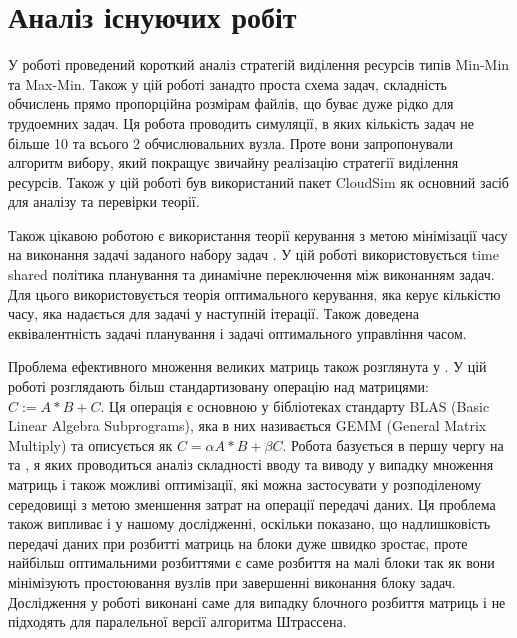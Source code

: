 \section{Аналіз існуючих робіт}

У роботі \cite{AppSelAlgoFEffResProvInCloud} проведений короткий аналіз стратегій виділення ресурсів типів Min-Min та Max-Min. Також у цій роботі занадто проста схема задач, складність обчислень прямо пропорційна розмірам файлів, що буває дуже рідко для трудоемних задач. Ця робота проводить симуляції, в яких кількість задач не більше 10 та всього 2 обчислювальних вузла. Проте вони запропонували алгоритм вибору, який покращує звичайну реалізацію стратегії виділення ресурсів. Також у цій роботі був використаний пакет CloudSim як основний засіб для аналізу та перевірки теорії.

Також цікавою роботою є використання теорії керування з метою мінімізації часу на виконання задачі заданого набору задач \cite{Prasanna1991GeneralisedMS}. У цій роботі використовується time shared політика планування та динамічне переключення між виконанням задач. Для цього використовується теорія оптимального керування, яка керує кількістю часу, яка надається для задачі у наступній ітерації. Також доведена еквівалентність задачі планування і задачі оптимального управління часом.

Проблема ефективного множення великих матриць також розглянута у \cite{PushingTheBoundsOfMatrixMatrix}. У цій роботі розглядають більш стандартизовану операцію над матрицями: $C := A*B + C$. Ця операція є основною у бібліотеках стандарту BLAS (Basic Linear Algebra Subprograms), яка в них називається GEMM (General Matrix Multiply) та описується як $C = \alpha A*B + \beta C$. Робота базується в першу чергу на \cite{IOComplexityMatrixMatrix} та \cite{Irony}, я яких проводиться аналіз складності вводу та виводу у випадку множення матриць і також можливі оптимізації, які можна застосувати у розподіленому середовищі з метою зменшення затрат на операції передачі даних. Ця проблема також випливає і у нашому дослідженні, оскільки показано, що надлишковість передачі даних при розбитті матриць на блоки дуже швидко зростає, проте найбільш оптимальними розбиттями є саме розбиття на малі блоки так як вони мінімізують простоювання вузлів при завершенні виконання блоку задач. Дослідження у роботі виконані саме для випадку блочного розбиття матриць і не підходять для паралельної версії алгоритма Штрассена.